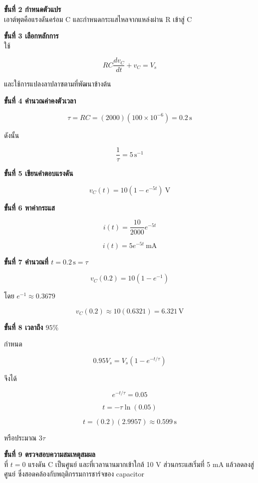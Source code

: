 \textbf{ขั้นที่ 2 กำหนดตัวแปร}\\
เอาต์พุตคือแรงดันคร่อม C และกำหนดกระแสไหลจากแหล่งผ่าน R เข้าสู่ C

\textbf{ขั้นที่ 3 เลือกหลักการ}\\
ใช้

\[
RC\frac{dv_C}{dt}+v_C=V_s
\]

และใช้การแปลงลาปลาซตามที่พัฒนาข้างต้น

\textbf{ขั้นที่ 4 คำนวณค่าคงตัวเวลา}

\[
\tau=RC=(2000)(100\times10^{-6})=0.2\,\text{s}
\]

ดังนั้น

\[
\frac{1}{\tau}=5\,\text{s}^{-1}
\]

\textbf{ขั้นที่ 5 เขียนคำตอบแรงดัน}

\[
\boxed{v_C(t)=10\left(1-e^{-5t}\right)\ \text{V}}
\]

\textbf{ขั้นที่ 6 หาค่ากระแส}

\[
i(t)=\frac{10}{2000}e^{-5t}
\]

\[
\boxed{i(t)=5e^{-5t}\ \text{mA}}
\]

\textbf{ขั้นที่ 7 คำนวณที่ $t=0.2\,\text{s}=\tau$}

\[
v_C(0.2)=10(1-e^{-1})
\]

โดย $e^{-1}\approx0.3679$

\[
v_C(0.2)\approx10(0.6321)=6.321\,\text{V}
\]

\textbf{ขั้นที่ 8 เวลาถึง $95\%$}

กำหนด

\[
0.95V_s=V_s(1-e^{-t/\tau})
\]

จึงได้

\[
e^{-t/\tau}=0.05
\]

\[
t=-\tau\ln(0.05)
\]

\[
t=(0.2)(2.9957)\approx0.599\,\text{s}
\]

หรือประมาณ $3\tau$

\textbf{ขั้นที่ 9 ตรวจสอบความสมเหตุสมผล}\\
ที่ $t=0$ แรงดัน C เป็นศูนย์ และที่เวลานานมากเข้าใกล้ 10 V ส่วนกระแสเริ่มที่ 5 mA แล้วลดลงสู่ศูนย์ ซึ่งสอดคล้องกับพฤติกรรมการชาร์จของ capacitor

